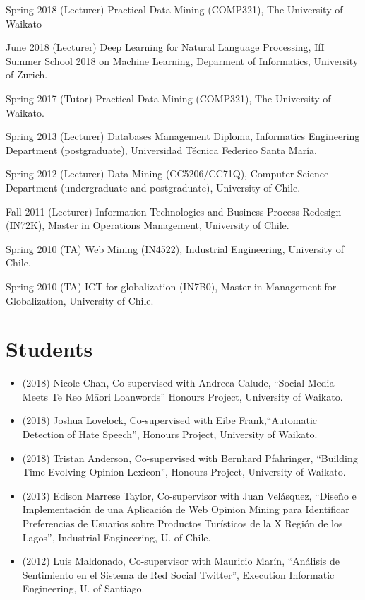 \documentclass[letterpaper]{article}
\begin{document}
\begin{CV}



\item [Spring 2018] (Lecturer) Practical Data Mining (COMP321), The University of Waikato

\item [June 2018] (Lecturer) Deep Learning for Natural Language Processing, IfI Summer School 2018 on Machine Learning,  Deparment of Informatics, University of Zurich. 

\item[Spring 2017] (Tutor) Practical Data Mining (COMP321), The University of Waikato.

\item[Spring 2013] (Lecturer) Databases Management Diploma, Informatics Engineering Department (postgraduate), Universidad Técnica Federico Santa María.

\item[Spring 2012] (Lecturer) Data Mining (CC5206/CC71Q), Computer Science Department (undergraduate and postgraduate), University of Chile.

\item[Fall 2011]   (Lecturer) Information Technologies and Business Process Redesign (IN72K), Master in Operations Management, University of Chile.

\item[Spring 2010]  (TA) Web Mining (IN4522), Industrial Engineering, University of Chile.

\item[Spring 2010]  (TA) ICT for globalization (IN7B0), Master in Management for Globalization, University of Chile.


\end{CV}

\section{Students}
\begin{itemize}

\item (2018) Nicole Chan, Co-supervised with Andreea Calude, ``Social Media Meets Te Reo Māori Loanwords''  Honours Project, University of Waikato. 
\item  (2018)  Joshua Lovelock, Co-supervised with Eibe Frank,``Automatic Detection of Hate Speech'', Honours Project, University of Waikato.
\item  (2018) Tristan Anderson, Co-supervised with Bernhard Pfahringer, ``Building Time-Evolving Opinion Lexicon'', Honours Project, University of Waikato.
\item (2013) Edison Marrese Taylor, Co-supervisor with Juan Velásquez, ``Diseño e Implementación de una Aplicación de Web Opinion Mining para Identificar Preferencias de Usuarios sobre Productos Turísticos de la X Región de los Lagos'', Industrial Engineering, U. of Chile.
\item (2012) Luis Maldonado, Co-supervisor with Mauricio Marín, ``Análisis de Sentimiento en el Sistema de Red Social Twitter'', Execution Informatic Engineering, U. of Santiago.

\end{itemize}
\end{document}
